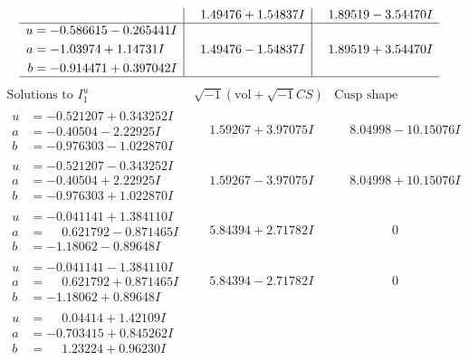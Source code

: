 \documentclass[1p]{elsarticle_modified}
\theoremstyle{definition}
\newcommand{\I}{\sqrt{-1}}
\begin{document}
$$\begin{array}{c|c|c}
 & \phantom{-}1.49476 + 1.54837 I & \phantom{-}1.89519 - 3.54470 I \\ \hline\begin{aligned}
u &= -0.586615 - 0.265441 I \\
a &= -1.03974 + 1.14731 I \\
b &= -0.914471 + 0.397042 I\end{aligned}
 & \phantom{-}1.49476 - 1.54837 I & \phantom{-}1.89519 + 3.54470 I\\
 \hline 
 \end{array}$$\newpage$$\begin{array}{c|c|c}  
\text{Solutions to }I^u_{1}& \I (\text{vol} + \sqrt{-1}CS) & \text{Cusp shape}\\
 \hline 
\begin{aligned}
u &= -0.521207 + 0.343252 I \\
a &= -0.40504 - 2.22925 I \\
b &= -0.976303 - 1.022870 I\end{aligned}
 & \phantom{-}1.59267 + 3.97075 I & \phantom{-}8.04998 - 10.15076 I \\ \hline\begin{aligned}
u &= -0.521207 - 0.343252 I \\
a &= -0.40504 + 2.22925 I \\
b &= -0.976303 + 1.022870 I\end{aligned}
 & \phantom{-}1.59267 - 3.97075 I & \phantom{-}8.04998 + 10.15076 I \\ \hline\begin{aligned}
u &= -0.041141 + 1.384110 I \\
a &= \phantom{-}0.621792 - 0.871465 I \\
b &= -1.18062 - 0.89648 I\end{aligned}
 & \phantom{-}5.84394 + 2.71782 I & \phantom{-0.000000 } 0 \\ \hline\begin{aligned}
u &= -0.041141 - 1.384110 I \\
a &= \phantom{-}0.621792 + 0.871465 I \\
b &= -1.18062 + 0.89648 I\end{aligned}
 & \phantom{-}5.84394 - 2.71782 I & \phantom{-0.000000 } 0 \\ \hline\begin{aligned}
u &= \phantom{-}0.04414 + 1.42109 I \\
a &= -0.703415 + 0.845262 I \\
b &= \phantom{-}1.23224 + 0.96230 I\end{aligned}

\end{array}$$
\end{document}
